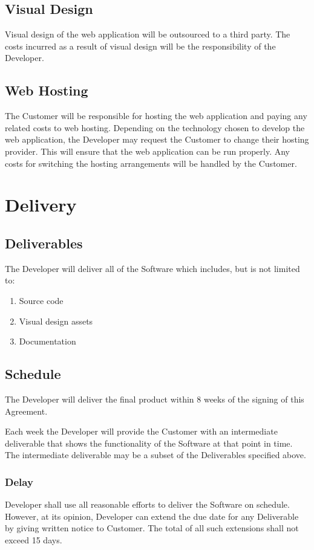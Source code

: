 \documentclass[11pt]{article}
\begin{document}
\subsection{Visual Design}
Visual design of the web application will be outsourced to a third party. The costs incurred as a result of visual design will be the responsibility of the Developer.
\subsection{Web Hosting}
The Customer will be responsible for hosting the web application and paying any related costs to web hosting. Depending on the technology chosen to develop the web application, the Developer may request the Customer to change their hosting provider. This will ensure that the web application can be run properly. Any costs for switching the hosting arrangements will be handled by the Customer.
\section{Delivery}
\subsection{Deliverables}
The Developer will deliver all of the Software which includes, but is not limited to:
\begin{enumerate}
\item Source code
\item Visual design assets 
\item Documentation
\end{enumerate}
\subsection{Schedule}
The Developer will deliver the final product within 8 weeks of the signing of this Agreement. 

Each week the Developer will provide the Customer with an intermediate deliverable that shows the functionality of the Software at that point in time. The intermediate deliverable may be a subset of the Deliverables specified above. 
\subsubsection{Delay}
Developer shall use all reasonable efforts to deliver the Software on schedule. However, at its opinion, Developer can extend the due date for any Deliverable by giving written notice to Customer. The total of all such extensions shall not exceed 15 days. 
\end{document}
